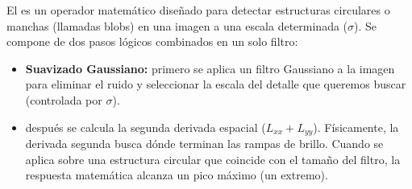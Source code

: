 \begin{definicion}
    El  es un operador matemático diseñado para detectar estructuras circulares o manchas (llamadas blobs) en una imagen a una escala determinada ($\sigma$). Se compone de dos pasos lógicos combinados en un solo filtro:
    \begin{itemize}
        \item \textbf{Suavizado Gaussiano:} primero se aplica un filtro Gaussiano a la imagen para eliminar el ruido y seleccionar la escala del detalle que queremos buscar (controlada por $\sigma$).
        \item {} después se calcula la segunda derivada espacial ($L_{xx} + L_{yy}$). Físicamente, la derivada segunda busca dónde terminan las rampas de brillo. Cuando se aplica sobre una estructura circular que coincide con el tamaño del filtro, la respuesta matemática alcanza un pico máximo (un extremo).
    \end{itemize}
\end{definicion}

